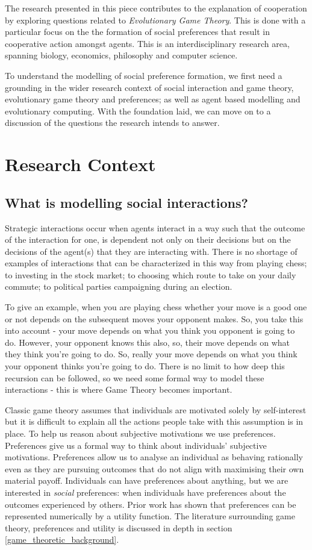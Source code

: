 \documentclass[11pt]{book}
\newcommand*{\np}{\par\noindent\newline}
\begin{document}
\np The research presented in this piece contributes to the explanation of cooperation by exploring questions related to \textit{Evolutionary Game Theory}.
This is done with a particular focus on the the formation of social preferences that result in cooperative action amongst agents.
This is an interdisciplinary research area, spanning biology, economics, philosophy and computer science.

\np To understand the modelling of social preference formation, we first need a grounding in the wider research context of social interaction and game theory, evolutionary game theory and preferences; as well as agent based modelling and evolutionary computing. 
With the foundation laid, we can move on to a discussion of the questions the research intends to answer.

\section{Research Context}
\subsection{What is modelling social interactions?}\label{modelling_social_interactions}
Strategic interactions occur when agents interact in a way such that the outcome of the interaction for one, is dependent not only on their decisions but on the decisions of the agent(s) that they are interacting with.
There is no shortage of examples of interactions that can be characterized in this way from playing chess;
to investing in the stock market; to choosing which route to take on your daily commute; to political parties campaigning during an election.

\np To give an example, when you are playing chess whether your move is a good one or not depends on the subsequent moves your opponent makes. 
So, you take this into account - your move depends on what you think you opponent is going to do.
However, your opponent knows this also, so, their move depends on what they think you're going to do.
So, really your move depends on what you think your opponent thinks you're going to do.
There is no limit to how deep this recursion can be followed, so we need some formal way to model these interactions - this is where Game Theory becomes important.

\np Classic game theory assumes that individuals are motivated solely by self-interest but it is difficult to explain all the actions people take with this assumption is in place.
To help us reason about subjective motivations we use preferences.
Preferences give us a formal way to think about individuals' subjective motivations.
Preferences allow us to analyse an individual as behaving rationally even as they are pursuing outcomes that do not align with maximising their own material payoff.
Individuals can have preferences about anything, but we are interested in \textit{social} preferences: when individuals have preferences about the outcomes experienced by others.
Prior work has shown that preferences can be represented numerically by a utility function.
The literature surrounding game theory, preferences and utility is discussed in depth in section \ref{game_theoretic_background}.
\end{document}
